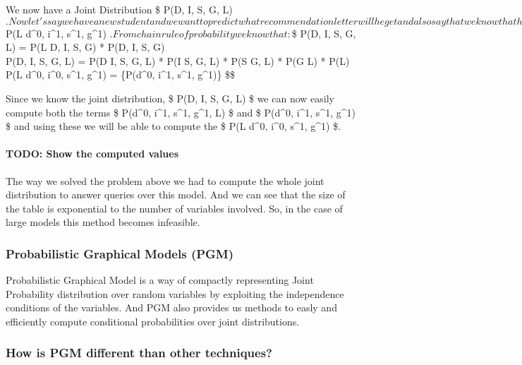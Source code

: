 \documentclass{article}
\begin{document}
    We now have a Joint Distribution \$ P(D, I, S, G, L)
$. Now let's say we have a new student and we want to predict what recommendation letter will he get and also say that we know that he is intelligent, the course was easy, his SAT score is good, and also he got a good grade. So, basically we want to compute $
P(L \textbar{} d\^{}0, i\^{}1, s\^{}1, g\^{}1)
$. From chain rule of probability we know that: $\$ P(D, I, S, G, L) =
P(L \textbar{} D, I, S, G) * P(D, I, S, G) \[
\] P(D, I, S, G, L) = P(D \textbar{} I, S, G, L) * P(I \textbar{} S, G,
L) * P(S \textbar{} G, L) * P(G \textbar{} L) * P(L) \[
\] P(L \textbar{} d\^{}0, i\^{}0, s\^{}1, g\^{}1) =
 \{P(d\^{}0, i\^{}1, s\^{}1, g\^{}1)\}
\$\$

Since we know the joint distribution, \$ P(D, I, S, G, L) \$ we can now
easily compute both the terms \$ P(d\^{}0, i\^{}1, s\^{}1, g\^{}1, L) \$
and \$ P(d\^{}0, i\^{}1, s\^{}1, g\^{}1) \$ and using these we will be
able to compute the \$ P(L \textbar{} d\^{}0, i\^{}0, s\^{}1, g\^{}1)
\$.

\paragraph{TODO: Show the computed
values}\label{todo-show-the-computed-values}

    The way we solved the problem above we had to compute the whole joint
distribution to answer queries over this model. And we can see that the
size of the table is exponential to the number of variables involved.
So, in the case of large models this method becomes infeasible.

    \subsubsection{Probabilistic Graphical Models
(PGM)}\label{probabilistic-graphical-models-pgm}

Probabilistic Graphical Model is a way of compactly representing Joint
Probability distribution over random variables by exploiting the
independence conditions of the variables. And PGM also provides us
methods to easly and efficiently compute conditional probabilities over
joint distributions.

    \subsubsection{How is PGM different than other
techniques?}\label{how-is-pgm-different-than-other-techniques}
\end{document}
